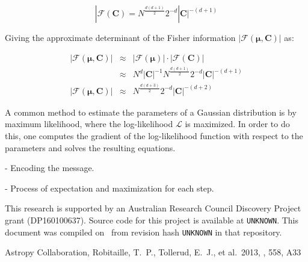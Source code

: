\documentclass{aastex61}
\newcommand{\githash}{UNKNOWN}
\newcommand{\giturl}{UNKNOWN}}
\begin{document}
\begin{equation}
|\mathcal{F}\left(\bm{C}\right) = N^\frac{d(d+1)}{2}2^{-d}|\bm{C}|^{-(d+1)}
\end{equation}

Giving the approximate determinant of the Fisher information $|\mathcal{F}\left(\bm{\mu},\bm{C}\right)|$ as:

\begin{eqnarray}
  |\mathcal{F}\left(\bm{\mu},\bm{C}\right)| & \approx & |\mathcal{F}\left(\bm{\mu}\right)|\cdot|\mathcal{F}\left(\bm{C}\right)| \\
  & \approx & N^{d}|\bm{C}|^{-1}N^\frac{d(d+1)}{2}2^{-d}|\bm{C}|^{-(d+1)} \\
  |\mathcal{F}\left(\bm{\mu},\bm{C}\right)| & \approx & N^\frac{d(d+3)}{2}2^{-d}|\bm{C}|^{-(d+2)}
\end{eqnarray}





A common method to estimate the parameters of a Gaussian distribution is by
maximum likelihood, where the log-likelihood $\mathcal{L}$ is maximized. In
order to do this, one computes the gradient of the log-likelihood function
with respect to the parameters and solves the resulting equations.


- Encoding the message.


- Process of expectation and maximization for each step.


\acknowledgments

This research is supported by an Australian Research Council Discovery Project
grant (DP160100637). 
Source code for this project is available at \texttt{\giturl}. This document
was compiled on \gitdate\ from revision hash \texttt{\githash} in that
repository. 



\begin{thebibliography}{}

 Astropy Collaboration, Robitaille, T.~P., Tollerud, E.~J., et al.\ 2013, \aap, 558, A33 

\end{thebibliography}
\end{document}
